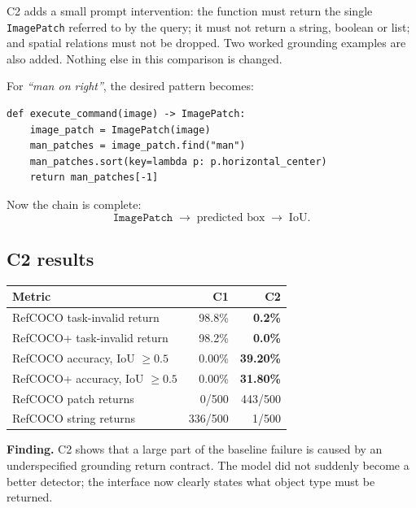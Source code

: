\documentclass[11pt,a4paper]{article}
\newcommand{\up}[1]{\textcolor{good}{\textbf{#1}}}
\begin{document}
\begin{center}
\end{center}

C2 adds a small prompt intervention: the function must return the single
\texttt{ImagePatch} referred to by the query; it must not return a string, boolean or
list; and spatial relations must not be dropped. Two worked grounding examples are
also added. Nothing else in this comparison is changed.

For \emph{``man on right''}, the desired pattern becomes:

\begin{lstlisting}
def execute_command(image) -> ImagePatch:
    image_patch = ImagePatch(image)
    man_patches = image_patch.find("man")
    man_patches.sort(key=lambda p: p.horizontal_center)
    return man_patches[-1]
\end{lstlisting}

Now the chain is complete:
\[
    \texttt{ImagePatch} \;\rightarrow\; \text{predicted box} \;\rightarrow\; \text{IoU}.
\]

\subsection{C2 results}

\begin{center}
\begin{tabular}{@{}lrr@{}}
\toprule
\textbf{Metric} & \textbf{C1} & \textbf{C2} \\
\midrule
RefCOCO task-invalid return  & 98.8\% & \up{0.2\%} \\
RefCOCO+ task-invalid return & 98.2\% & \up{0.0\%} \\
RefCOCO accuracy, IoU $\geq 0.5$  & 0.00\% & \up{39.20\%} \\
RefCOCO+ accuracy, IoU $\geq 0.5$ & 0.00\% & \up{31.80\%} \\
RefCOCO patch returns  & 0/500 & 443/500 \\
RefCOCO string returns & 336/500 & 1/500 \\
\bottomrule
\end{tabular}
\end{center}

\begin{finding}
\textbf{Finding.} C2 shows that a large part of the baseline failure is caused by an
underspecified grounding return contract. The model did not suddenly become a better
detector; the interface now clearly states what object type must be returned.
\end{finding}
\end{document}
